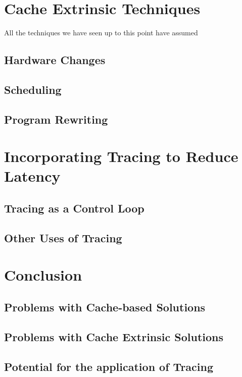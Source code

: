 \section{Cache Extrinsic Techniques}

All the techniques we have seen up to this point have assumed

\subsection{Hardware Changes}

\subsection{Scheduling}

\subsection{Program Rewriting}

\section{Incorporating Tracing to Reduce Latency}

\subsection{Tracing as a Control Loop}

\subsection{Other Uses of Tracing}

\section{Conclusion}

\subsection{Problems with Cache-based Solutions}

\subsection{Problems with Cache Extrinsic Solutions}

\subsection{Potential for the application of Tracing}

